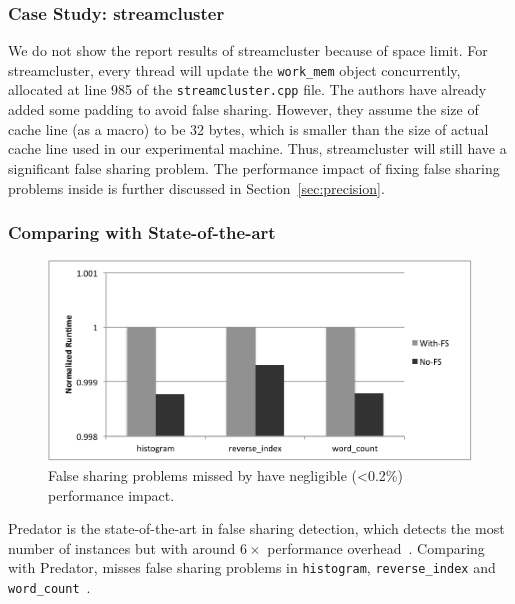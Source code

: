 \subsubsection{Case Study: streamcluster}

We do not show the report results of streamcluster because of space limit. For streamcluster, every thread will update the \texttt{work\_mem} object concurrently, allocated at line 985 of the \texttt{streamcluster.cpp} file. The authors have already added some padding to avoid false sharing. However, they assume the size of cache line (as a macro) to be 32 bytes, which is smaller than the size of actual cache line used in our experimental machine. Thus, streamcluster will still have a significant false sharing problem. The performance impact of fixing false sharing problems inside is further discussed in Section~\ref{sec:precision}. 


\subsubsection{Comparing with State-of-the-art}

\begin{figure}[htbp]
\centering
\includegraphics[width=1\columnwidth]{figure/trivial.pdf}
\caption{False sharing problems missed by \cheetah{} have negligible (<0.2\%) performance impact. \label{fig:fseffectiveness}}
\end{figure}

Predator is the state-of-the-art in false sharing detection, which detects the most number of instances but with around $6\times$ performance overhead~\cite{Predator}. Comparing with Predator, \cheetah{} misses false sharing problems in \texttt{histogram}, \texttt{reverse\_index} and \texttt{word\_count}~\cite{Predator}. 

